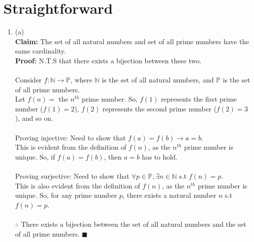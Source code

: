 \documentclass[a4paper]{article}
\begin{document}
\section{Straightforward}
\begin{enumerate}
    \item (a)\\
    \textbf{Claim:} The set of all natural numbers and set of all prime numbers have the same cardinality. \\
    \textbf{Proof:} N.T.S that there exists a bijection between these two. \\
    \\
    Consider $f:\mathbb{N} \rightarrow \mathbb{P}$, where $\mathbb{N}$ is the set of all natural numbers, and $\mathbb{P}$ is the set of all prime numbers.\\
    Let $f(n) =$ the $n^{th}$ prime number. So, $f(1)$ represents the first prime number ($f(1) = 2$), $f(2)$ represents the second prime number ($f(2) = 3$), and so on.\\
    \\
    Proving injective: Need to show that $f(a) = f(b) \rightarrow a = b$.\\
    This is evident from the definition of $f(n)$, as the $n^{th}$ prime number is unique. So, if $f(a) = f(b)$, then $a = b$ has to hold.\\
    \\
    Proving surjective: Need to show that $\forall p \in \mathbb{P}, \exists n \in \mathbb{N}$ s.t $f(n) = p$.\\
    This is also evident from the definition of $f(n)$, as the $n^{th}$ prime number is unique. So, for any prime number $p$, there exists a natural number $n$ s.t $f(n) = p$.\\
    \\
    $\therefore$ There exists a bijection between the set of all natural numbers and the set of all prime numbers. $\blacksquare$\\


\end{enumerate}
\end{document}
